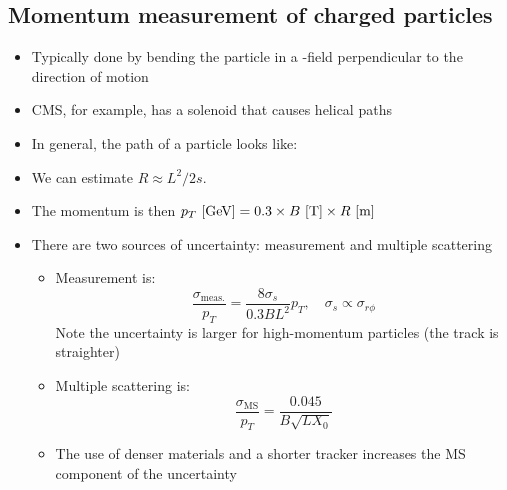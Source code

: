 \subsection{Momentum measurement of charged particles}
\begin{itemize}
  \item Typically done by bending the particle in a \B-field perpendicular to the direction of motion
  \item CMS, for example, has a solenoid that causes helical paths
  \item In general, the path of a particle looks like:
  \item We can estimate $R \approx L^2/2s$. 
  \item The momentum is then $p_T~[\text{GeV}] = 0.3 \times B~[\text{T}] \times R~[\text{m}]$
  \item There are two sources of uncertainty: measurement and multiple scattering
  \begin{itemize}
    \item Measurement is:
    \begin{equation}
      \frac{\sigma_\text{meas.}}{p_T} = \frac{8 \sigma_s}{0.3 BL^2} p_T, \quad \sigma_s \propto \sigma_{r\phi}
    \end{equation}
    Note the uncertainty is larger for high-momentum particles (the track is straighter)
    \item Multiple scattering is:
    \begin{equation}
      \frac{\sigma_\text{MS}}{p_T} = \frac{0.045}{B\sqrt{L X_0}}
    \end{equation}
    \item The use of denser materials and a shorter tracker increases the MS component of the uncertainty
  \end{itemize}
\end{itemize}

